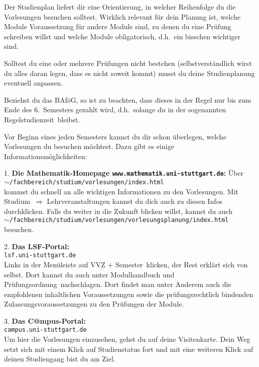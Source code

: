 Der Studienplan liefert dir eine Orientierung,
in welcher Reihenfolge du die Vorlesungen besuchen solltest.
Wirklich relevant für dein Planung ist,
welche Module Voraussetzung für andere Module sind,
zu denen du eine Prüfung schreiben willst
und welche Module obligatorisch,
d.h.\ ein bisschen wichtiger sind.

Solltest du eine oder mehrere Prüfungen nicht bestehen
(selbstverständlich wirst du alles daran legen,
dass es nicht soweit kommt)
musst du deine Studienplanung eventuell anpassen.

Beziehst du das BAföG, so ist zu beachten,
dass dieses in der Regel nur bis zum Ende
des 6.~Semesters gezahlt wird,
d.h.\ solange du in der sogenannten
\glqq Regelstudienzeit\grqq\ bleibst.

Vor Beginn eines jeden Semesters kannst du dir schon überlegen,
welche Vorlesungen du besuchen möchtest.
Dazu gibt es einige Informationsmöglichkeiten:

1. {\bf Die Mathematik-Homepage {\verb|www.mathematik.uni-stuttgart.de|}:}
Über\\ 
$ \sim ${\verb|/fachbereich/studium/vorlesungen/index.html|}\\
kommst du schnell an alle wichtigen Informationen zu den Vorlesungen.
Mit \glqq Studium\grqq\ $\Rightarrow$ \glqq Lehrveranstaltungen\grqq 
kannst du dich auch zu diesen Infos durchklicken.
Falls du weiter in die Zukunft blicken willst, kannst du auch\\
$ \sim ${\verb|/fachbereich/studium/vorlesungen/vorlesungsplanung/index.html|}\\
besuchen.


2. {\bf Das LSF-Portal:}\\
{\verb|lsf.uni-stuttgart.de|}\\
Links in der Menüleiste auf \glqq VVZ + Semester\grqq\ klicken,
der Rest erklärt sich von selbst.
Dort kannst du auch unter \glqq Modulhandbuch
und Prüfungsordnung\grqq\ nachschlagen.
Dort findet man unter Anderem
auch die empfohlenen inhaltlichen Voraussetzungen
sowie die prüfungsrechtlich bindenden
Zulassungsvoraussetzungen zu den Prüfungen der Module.

3. {\bf Das C@mpus-Portal:}\\
{\verb|campus.uni-stuttgart.de|}\\
Um hier die Vorlesungen einzusehen, gehst du auf deine Visitenkarte.
Dein Weg setzt sich mit einem Klick auf Studienstatus fort und mit
eine weiteren Klick auf deinen Studiengang bist du am Ziel.


